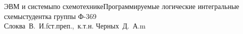 


\usepackage{color}
\usepackage[colorlinks,linkcolor=black,filecolor=blue,citecolor=darkgreen]{hyperref}


    {ЭВМ и системы}{по схемотехнике}{Программируемые логические интегральные
    схемы}{студентка группы Ф-369\\Слоква~В.~И.}{f}{ст.преп.,~к.т.н. Черных~Д.~А.}{m}
        
    \tableofcontents
    \thispagestyle{empty}
    \newpage
    
